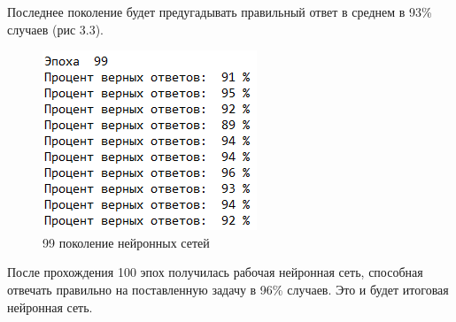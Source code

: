 Последнее поколение будет предугадывать правильный ответ в среднем в 93\% случаев (рис 3.3).

\begin{figure}[H]
  \centering
  \includegraphics[width=0.4\linewidth]{./img/99}
  \caption{99 поколение нейронных сетей}
  \label{fig:mpr} 
\end{figure}

После прохождения 100 эпох получилась рабочая нейронная сеть, способная отвечать правильно на поставленную задачу в 96\% случаев. Это и будет итоговая нейронная сеть.